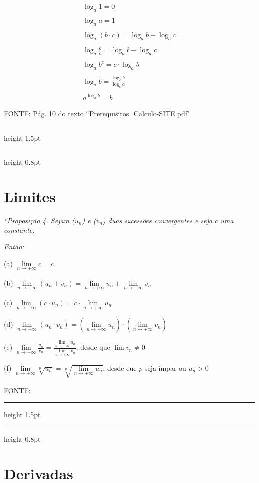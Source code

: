\documentclass[portuguese,a4paper,12pt,onecolumn,fleqn]{article}
\newcommand{\myline}{\par
  \kern3pt %
  \hrule height 1.5pt
  \kern2pt %
  \hrule height 0.8pt
  \kern3pt %
}
\begin{document}
\begin{gather*}
\log_a 1 = 0
\\
\\
\log_a a = 1
\\
\\
\log_a (b \cdot c) = \log_a b + \log_a c
\\
\\
\log_a \frac{b}{c} = \log_a b - \log_a c
\\
\\
\log_a b^c = c \cdot \log_a b
\\
\\
\log_a b = \frac{\log_c b}{\log_c a}
\\
\\
a^{\log_a b} = b
\end{gather*}


FONTE: Pág. 10 do texto ``Prerequisitos\_Calculo-SITE.pdf"


\myline	%

\section*{Limites}

\textit{``Proposição 4. Sejam ($u_n$) e ($v_n$) duas sucessões convergentes e seja $c$ uma constante.}

\textit{Então:}

(a) $\lim\limits_{n \to +\infty} c = c$

(b) $\lim\limits_{n \to +\infty}(u_n + v_n ) = \lim\limits_{n \to +\infty}u_n + \lim\limits_{n \to +\infty}v_n$

(c) $\lim\limits_{n \to +\infty}(c \cdot u_n ) = c \cdot \lim\limits_{n \to +\infty}u_n$

(d) $\lim\limits_{n \to +\infty}(u_n \cdot v_n ) = (\lim\limits_{n \to +\infty}u_n) \cdot (\lim\limits_{n \to +\infty}v_n)$

(e)	$\lim\limits_{n \to +\infty}\frac{u_n}{v_n} = \frac{\lim\limits_{n \to +\infty}u_n}{\lim\limits_{n \to +\infty}v_n}$, 
desde que $\lim v_n \ne 0$

(f) $\lim\limits_{n \to +\infty}\sqrt[p]{u_n} = \sqrt[p]{\lim\limits_{n \to +\infty} u_n}$, desde que $p$ seja ímpar ou $u_n > 0$

FONTE: 

\myline	%


\section*{Derivadas}
\end{document}
